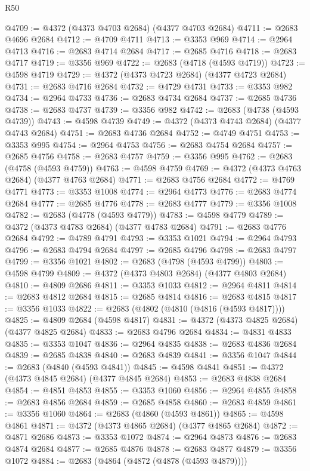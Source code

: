 \begin{lexlean}{R50}
\begin{coremodule}
@4709 := @4372 (@4373 @4703 @2684) (@4377 @4703 @2684)
@4711 := @2683 @4696 @2684
@4712 := @4709 @4711
@4713 := @3353 @969
@4714 := @2964 @4713
@4716 := @2683 @4714 @2684
@4717 := @2685 @4716
@4718 := @2683 @4717
@4719 := @3356 @969
@4722 := @2683 (@4718 (@4593 @4719))
@4723 := @4598 @4719
@4729 := @4372 (@4373 @4723 @2684) (@4377 @4723 @2684)
@4731 := @2683 @4716 @2684
@4732 := @4729 @4731
@4733 := @3353 @982
@4734 := @2964 @4733
@4736 := @2683 @4734 @2684
@4737 := @2685 @4736
@4738 := @2683 @4737
@4739 := @3356 @982
@4742 := @2683 (@4738 (@4593 @4739))
@4743 := @4598 @4739
@4749 := @4372 (@4373 @4743 @2684) (@4377 @4743 @2684)
@4751 := @2683 @4736 @2684
@4752 := @4749 @4751
@4753 := @3353 @995
@4754 := @2964 @4753
@4756 := @2683 @4754 @2684
@4757 := @2685 @4756
@4758 := @2683 @4757
@4759 := @3356 @995
@4762 := @2683 (@4758 (@4593 @4759))
@4763 := @4598 @4759
@4769 := @4372 (@4373 @4763 @2684) (@4377 @4763 @2684)
@4771 := @2683 @4756 @2684
@4772 := @4769 @4771
@4773 := @3353 @1008
@4774 := @2964 @4773
@4776 := @2683 @4774 @2684
@4777 := @2685 @4776
@4778 := @2683 @4777
@4779 := @3356 @1008
@4782 := @2683 (@4778 (@4593 @4779))
@4783 := @4598 @4779
@4789 := @4372 (@4373 @4783 @2684) (@4377 @4783 @2684)
@4791 := @2683 @4776 @2684
@4792 := @4789 @4791
@4793 := @3353 @1021
@4794 := @2964 @4793
@4796 := @2683 @4794 @2684
@4797 := @2685 @4796
@4798 := @2683 @4797
@4799 := @3356 @1021
@4802 := @2683 (@4798 (@4593 @4799))
@4803 := @4598 @4799
@4809 := @4372 (@4373 @4803 @2684) (@4377 @4803 @2684)
@4810 := @4809 @2686
@4811 := @3353 @1033
@4812 := @2964 @4811
@4814 := @2683 @4812 @2684
@4815 := @2685 @4814
@4816 := @2683 @4815
@4817 := @3356 @1033
@4822 := @2683 (@4802 (@4810 (@4816 (@4593 @4817))))
@4825 := @4809 @2684 (@4598 @4817)
@4831 := @4372 (@4373 @4825 @2684) (@4377 @4825 @2684)
@4833 := @2683 @4796 @2684
@4834 := @4831 @4833
@4835 := @3353 @1047
@4836 := @2964 @4835
@4838 := @2683 @4836 @2684
@4839 := @2685 @4838
@4840 := @2683 @4839
@4841 := @3356 @1047
@4844 := @2683 (@4840 (@4593 @4841))
@4845 := @4598 @4841
@4851 := @4372 (@4373 @4845 @2684) (@4377 @4845 @2684)
@4853 := @2683 @4838 @2684
@4854 := @4851 @4853
@4855 := @3353 @1060
@4856 := @2964 @4855
@4858 := @2683 @4856 @2684
@4859 := @2685 @4858
@4860 := @2683 @4859
@4861 := @3356 @1060
@4864 := @2683 (@4860 (@4593 @4861))
@4865 := @4598 @4861
@4871 := @4372 (@4373 @4865 @2684) (@4377 @4865 @2684)
@4872 := @4871 @2686
@4873 := @3353 @1072
@4874 := @2964 @4873
@4876 := @2683 @4874 @2684
@4877 := @2685 @4876
@4878 := @2683 @4877
@4879 := @3356 @1072
@4884 := @2683 (@4864 (@4872 (@4878 (@4593 @4879))))

\end{coremodule}
\end{lexlean}
